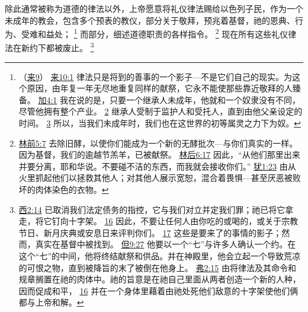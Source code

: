 \documentclass[12pt, a4paper, oneside]{ctexart}
\newcounter{parnum}[section]
\newcommand{\N}{%
   \noindent\refstepcounter{parnum}%
    \makebox[\parindent][l]{\textbf{\arabic{parnum}.}}}
\begin{document}
\N 除此通常被称为道德的律法以外，上帝愿意将礼仪律法赐给以色列子民，作为一个未成年的教会，包含多个预表的教仪，部分关于敬拜，预兆着基督，祂的恩典、行为、受难和益处；
	\footnote {
		（\href{https://biblehub.com/niv/hebrews/9.htm}{来9}）
		\href{https://biblehub.com/hebrews/10-1.htm}{来10:1} 律法只是将到的善事的一个影子---不是它们自己的现实。为这个原因，由年复一年无尽地重复同样的献祭，它永不能使那些靠近敬拜的人臻备。
		\href{https://biblehub.com/galatians/4-1.htm}{加4:1} 我在说的是，只要一个继承人未成年，他就和一个奴隶没有不同，尽管他拥有整个产业。
		\href{https://biblehub.com/galatians/4-2.htm}{2} 继承人受制于监护人和受托人，直到由他父亲设定的时间。
		\href{https://biblehub.com/galatians/4-3.htm}{3} 所以，当我们未成年时，我们也在这世界的初等属灵之力下为奴。
	}
	而部分，细述道德职责的各样指令。
	\footnote {
		\href{https://biblehub.com/1_corinthians/5-7.htm}{林前5:7} 去除旧酵，以使你们能成为一个新的无酵批次---与你们真实的一样。因为基督，我们的逾越节羔羊，已被献祭。
		\href{https://biblehub.com/2_corinthians/6-17.htm}{林后6:17} 因此，“从他们那里出来并要分离，耶和华说。不要碰不洁的东西，而我就会接收你们。”
		\href{https://biblehub.com/jude/1-23.htm}{犹1:23} 由从火里抓起他们以拯救其他人；对其他人展示宽恕，混合着畏惧---甚至厌恶被败坏的肉体染色的衣物。
	}
	现在所有这些礼仪律法在新约下都被废止。
	\footnote {
		\href{https://biblehub.com/colossians/2-14.htm}{西2:14} 已取消我们法定债务的指控，它与我们对立并定我们罪；祂已将它拿走，将它钉向十字架。
		\href{https://biblehub.com/colossians/2-16.htm}{16} 因此，不要让任何人由你吃的或喝的，或关于宗教节日、新月庆典或安息日来评判你们。
		\href{https://biblehub.com/colossians/2-17.htm}{17} 这些是要来了的事情的影子；然而，真实在基督中被找到。
		\href{https://biblehub.com/daniel/9-27.htm}{但9:27} 他要以一个“七”与许多人确认一个约。在这个“七”的中间，他将终结献祭和供品。并在神殿里，他会立起一个导致荒凉的可恨之物，直到被降旨的末了被倒在他身上。
		\href{https://biblehub.com/ephesians/2-15.htm}{弗2:15} 由将律法及其命令和规章搁置在祂的肉体中。祂的旨意是在祂自己里面从两者创造一个新的人种，因而促成和平，
		\href{https://biblehub.com/ephesians/2-16.htm}{16} 并在一个身体里藉着由祂处死他们敌意的十字架使他们俩都与上帝和解。
	}
\end{document}
